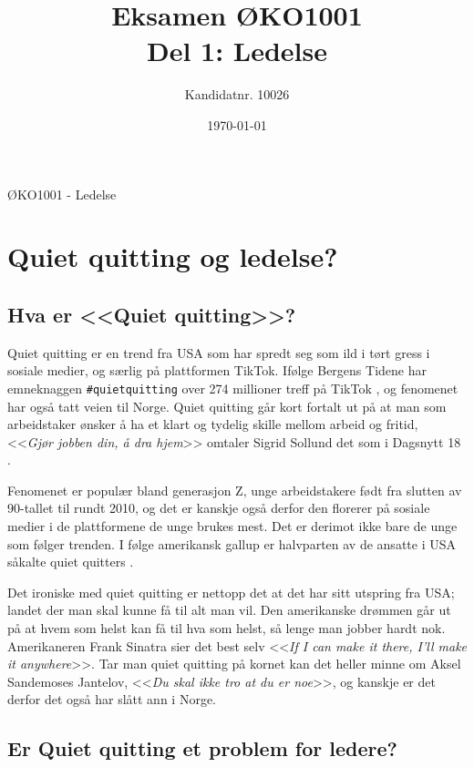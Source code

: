 \documentclass[a4paper, 12pt]{article}  %
\title{Eksamen ØKO1001\\Del 1: Ledelse} %
\author{Kandidatnr. 10026}              %
\date{\today}                           %
\begin{document}
\maketitle
\vfill
\begin{center}
  ØKO1001 - Ledelse
\end{center}
\thispagestyle{empty}
\addtocounter{page}{-1}
\newpage
\tableofcontents %
\thispagestyle{empty}
\addtocounter{page}{-1}
\newpage
\section{Quiet quitting og ledelse?}

\subsection{Hva er <<Quiet quitting>>?}

Quiet quitting er en trend fra USA som har spredt seg som ild i tørt gress i sosiale medier, og særlig på plattformen TikTok. 
Ifølge Bergens Tidene har emneknaggen \texttt{\#quietquitting} over 274 millioner treff på TikTok \parencite{bt22}, og fenomenet har også tatt veien til Norge. 
Quiet quitting går kort fortalt ut på at man som arbeidstaker ønsker å ha et klart og tydelig skille mellom arbeid og fritid, 
<<\emph{Gjør jobben din, å dra hjem}>> omtaler Sigrid Sollund det som i Dagsnytt 18 \parencite{dax18}.

Fenomenet er populær bland generasjon Z, unge arbeidstakere født fra slutten av 90-tallet til rundt 2010, 
og det er kanskje også derfor den florerer på sosiale medier i de plattformene de unge brukes mest.
Det er derimot ikke bare de unge som følger trenden. 
I følge amerikansk gallup er halvparten av de ansatte i USA såkalte quiet quitters \parencite{dax18}.

Det ironiske med quiet quitting er nettopp det at det har sitt utspring fra USA; landet der man skal kunne få til alt man vil. 
Den amerikanske drømmen går ut på at hvem som helst kan få til hva som helst, så lenge man jobber hardt nok. 
Amerikaneren Frank Sinatra sier det best selv <<\emph{If I can make it there, I'll make it anywhere}>>. 
Tar man quiet quitting på kornet kan det heller minne om Aksel Sandemoses Jantelov, <<\emph{Du skal ikke tro at du \emph{er} noe}>>, og kanskje er det derfor det også har slått ann i Norge.

\subsection{Er Quiet quitting et problem for ledere?}
\end{document}
